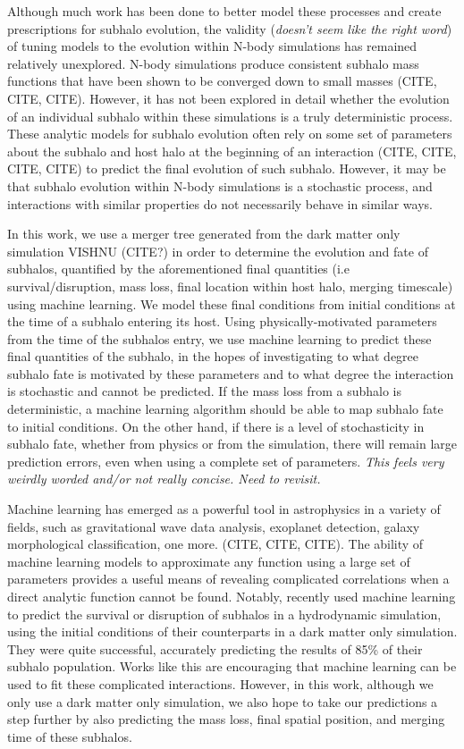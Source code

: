 \documentclass[fleqn,usenatbib]{mnras}
\newcommand\edits[1]{{\color{red}#1}}
\begin{document}
Although much work has been done to better model these processes and create prescriptions for subhalo evolution, the validity (\textit{doesn't seem like the right word}) of tuning models to the evolution within N-body simulations has remained relatively unexplored. N-body simulations produce consistent subhalo mass functions that have been shown to be converged down to small masses (CITE, CITE, CITE). However, it has not been explored in detail whether the evolution of an individual subhalo within these simulations is a truly deterministic process. These analytic models for subhalo evolution often rely on some set of parameters about the subhalo and host halo at the beginning of an interaction (CITE, CITE, CITE, CITE) to predict the final evolution of such subhalo. However, it may be that subhalo evolution within N-body simulations is a stochastic process, and interactions with similar properties do not necessarily behave in similar ways.

In this work, we use a merger tree generated from the dark matter only simulation VISHNU (CITE?) in order to determine the evolution and fate of subhalos, quantified by the aforementioned final quantities (i.e survival/disruption, mass loss, final location within host halo, merging timescale) using machine learning. We model these final conditions from initial conditions at the time of a subhalo entering its host. Using physically-motivated parameters from the time of the subhalos entry, we use machine learning to predict these final quantities of the subhalo, in the hopes of investigating to what degree subhalo fate is motivated by these parameters and to what degree the interaction is stochastic and cannot be predicted. If the mass loss from a subhalo is deterministic, a machine learning algorithm should be able to map subhalo fate to initial conditions. On the other hand, if there is a level of stochasticity in subhalo fate, whether from physics or from the simulation, there will remain large prediction errors, even when using a complete set of parameters. \textit{This feels very weirdly worded and/or not really concise. Need to revisit.}

Machine learning has emerged as a powerful tool in astrophysics in a variety of fields, such as gravitational wave data analysis, exoplanet detection, galaxy morphological classification, one more. (CITE, CITE, CITE). The ability of machine learning models to approximate any function using a large set of parameters provides a useful means of revealing complicated correlations when a direct analytic function cannot be found. Notably, \citet{Nadler2017} recently used machine learning to predict the survival or disruption of subhalos in a hydrodynamic simulation, using the initial conditions of their counterparts in a dark matter only simulation. They were quite successful, accurately predicting the results of 85\% of their subhalo population. Works like this are encouraging that machine learning can be used to fit these complicated interactions. \edits{However, in this work, although we only use a dark matter only simulation, we also hope to take our predictions a step further by also predicting the mass loss, final spatial position, and merging time of these subhalos.}
\end{document}
